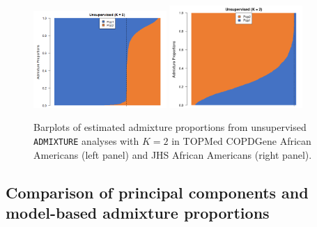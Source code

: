 \documentclass[12pt]{article}
\begin{document}
\begin{figure}
\center
\includegraphics[width=0.45\textwidth]{figs/COPD_barplot_unsupervised_K2}
\includegraphics[width=0.45\textwidth]{figs/JHS_barplot_unsupervised_K2}
\caption{Barplots of estimated admixture proportions from unsupervised \texttt{ADMIXTURE} analyses with $K = 2$ in TOPMed COPDGene African Americans (left panel) and JHS African Americans (right panel).
}
\label{fig:barplots}
\end{figure}


\subsection{Comparison of principal components and model-based admixture proportions}
\end{document}
